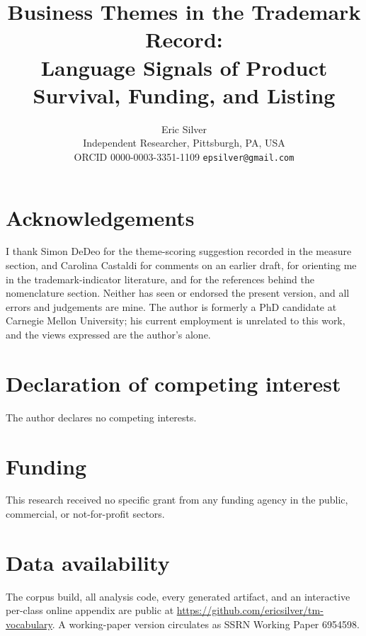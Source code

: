 
\title{\bfseries Business Themes in the Trademark Record:\\
\large Language Signals of Product Survival, Funding, and Listing}
\author{Eric Silver\\[0.3em]
\normalsize Independent Researcher, Pittsburgh, PA, USA\\
\normalsize ORCID 0000-0003-3351-1109 \quad \texttt{epsilver@gmail.com}}
\date{}


\maketitle
\thispagestyle{empty}

\section*{Acknowledgements}
I thank Simon DeDeo for the theme-scoring suggestion recorded in the
measure section, and Carolina Castaldi for comments on an earlier draft,
for orienting me in the trademark-indicator literature, and for the
references behind the nomenclature section. Neither has seen or endorsed
the present version, and all errors and judgements are mine. The author
is formerly a PhD candidate at Carnegie Mellon University; his current
employment is unrelated to this work, and the views expressed are the
author's alone.

\section*{Declaration of competing interest}
The author declares no competing interests.

\section*{Funding}
This research received no specific grant from any funding agency in the
public, commercial, or not-for-profit sectors.

\section*{Data availability}
The corpus build, all analysis code, every generated artifact, and an
interactive per-class online appendix are public at
\url{https://github.com/ericsilver/tm-vocabulary}. A working-paper
version circulates as SSRN Working Paper 6954598.

